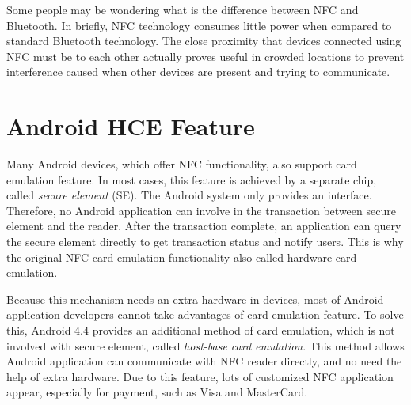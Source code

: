 \begin{CJK}{Bg5}{bsmi}
Some people may be wondering what is the difference between NFC and Bluetooth. In briefly, NFC technology consumes little power when compared to standard Bluetooth technology\cite{nfc-ble-1}\cite{nfc-ble-2}. The close proximity that devices connected using NFC must be to each other actually proves useful in crowded locations to prevent interference caused when other devices are present and trying to communicate. 

\section{Android HCE Feature}

Many Android devices, which offer NFC functionality, also support card emulation feature. In most cases, this feature is achieved by a separate chip, called \emph{secure element} (SE). The Android system only provides an interface. Therefore, no Android application can involve in the transaction between secure element and the reader. After the transaction complete, an application can query the secure element directly to get transaction status and notify users. This is why the original NFC card emulation functionality also called hardware card emulation.

Because this mechanism needs an extra hardware in devices, most of Android application developers cannot take advantages of card emulation feature. To solve this, Android 4.4 provides an additional method of card emulation, which is not involved with secure element, called \emph{host-base card emulation}. This method allows Android application can communicate with NFC reader directly, and no need the help of extra hardware. Due to this feature, lots of customized NFC application appear, especially for payment, such as Visa and MasterCard\cite{nfc-visa}.

\begin{comment}
\section{OpenID}

OpenID (OID)\cite{openid} is an open standard and decentralized protocol by the non-profit OpenID Foundation that allows users to be authenticated by certain co-operating sites (known as Relying Parties or RP) using a third party service. 

This eliminates the need for webmasters to provide their own ad hoc systems and allowing users to consolidate their digital identities. In other words, users can log into multiple unrelated websites without having to register with their information over and over again. Fig~\ref{fig:openid-flow} is the overview of OpenID protocol and the user flow.
\begin{figure}
\centering
\texttt{[image: picture/openid-flow.png]}
\caption{OpenID overview\cite{openid-flow}}
\label{fig:openid-flow}
\end{figure}
\end{comment}



\end{CJK}
